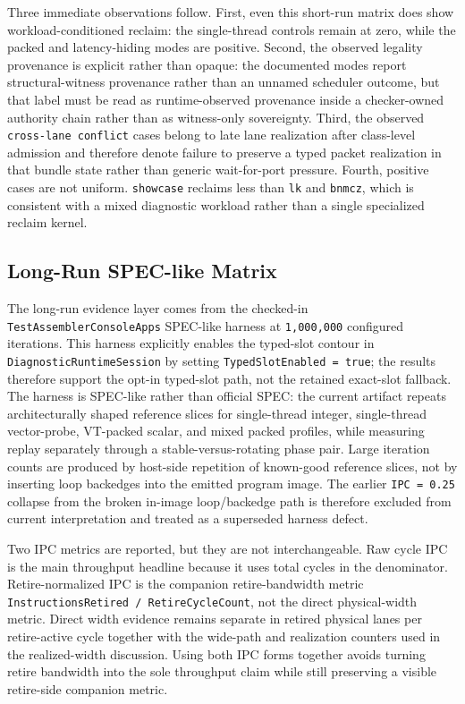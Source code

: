 \documentclass[twocolumn]{article}
\begin{document}
Three immediate observations follow. First, even this short-run matrix does show workload-conditioned reclaim: the single-thread controls remain at zero, while the packed and latency-hiding modes are positive. Second, the observed legality provenance is explicit rather than opaque: the documented modes report structural-witness provenance rather than an unnamed scheduler outcome, but that label must be read as runtime-observed provenance inside a checker-owned authority chain rather than as witness-only sovereignty. Third, the observed \texttt{cross-lane conflict} cases belong to late lane realization after class-level admission and therefore denote failure to preserve a typed packet realization in that bundle state rather than generic wait-for-port pressure. Fourth, positive cases are not uniform. \texttt{showcase} reclaims less than \texttt{lk} and \texttt{bnmcz}, which is consistent with a mixed diagnostic workload rather than a single specialized reclaim kernel.


\subsection{Long-Run SPEC-like Matrix}

The long-run evidence layer comes from the checked-in \texttt{TestAssemblerConsoleApps} SPEC-like harness at \texttt{1,000,000} configured iterations. This harness explicitly enables the typed-slot contour in \texttt{DiagnosticRuntimeSession} by setting \texttt{TypedSlotEnabled = true}; the results therefore support the opt-in typed-slot path, not the retained exact-slot fallback. The harness is SPEC-like rather than official SPEC: the current artifact repeats architecturally shaped reference slices for single-thread integer, single-thread vector-probe, VT-packed scalar, and mixed packed profiles, while measuring replay separately through a stable-versus-rotating phase pair. Large iteration counts are produced by host-side repetition of known-good reference slices, not by inserting loop backedges into the emitted program image. The earlier \texttt{IPC = 0.25} collapse from the broken in-image loop/backedge path is therefore excluded from current interpretation and treated as a superseded harness defect.



Two IPC metrics are reported, but they are not interchangeable. Raw cycle IPC is the main throughput headline because it uses total cycles in the denominator. Retire-normalized IPC is the companion retire-bandwidth metric \texttt{InstructionsRetired / RetireCycleCount}, not the direct physical-width metric. Direct width evidence remains separate in retired physical lanes per retire-active cycle together with the wide-path and realization counters used in the realized-width discussion. Using both IPC forms together avoids turning retire bandwidth into the sole throughput claim while still preserving a visible retire-side companion metric.
\end{document}
